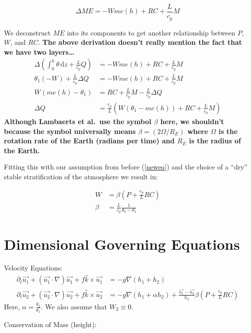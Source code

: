 \documentclass[10pt]{article}
\newcommand{\rmd}{\,\mathrm{d}}
\begin{document}
\begin{equation}
 \Delta ME = -W me(h) + RC + \frac{L}{c_p} M
\end{equation}

We deconstruct $ME$ into its components to get another relationship between $P$, $W$, and $RC$. 
{\bf The above derivation doesn't really mention the fact that we have two layers\ldots}
\begin{align*}
\Delta \left(\int_{0}^{h}\theta \rmd z + \frac{L}{c_p}Q \right) &= -W me(h) + RC + \frac{L}{c_p} M \\
\theta_1(-W) + \frac{L}{c_p}\Delta Q &=  -W me(h) + RC + \frac{L}{c_p} M \\
W \left(me(h) - \theta_1 \right) &= RC + \frac{L}{c_p} M  - \frac{L}{c_p}\Delta Q\\
\Delta Q &=\frac{c_p}{L} \left(W \left(\theta_1 - me(h) \right) + RC + \frac{L}{c_p} M  \right)
\end{align*}
{\bf Although Lambaerts et al.~use the symbol $\beta$ here, we shouldn't because the symbol universally means $\beta = (2\Omega/R_E)$ where $\Omega$ is the rotation rate of the Earth (radians per time) and $R_E$ is the radius of the Earth.}

Fitting this with our assumption from before (\ref{neweq}) and the choice of a ``dry'' stable stratification of the atmosphere we result in:

\begin{align}
W &= \beta\left(P+\frac{c_p}{L} RC\right)\\
\beta &= \frac{L}{c_p}\frac{1}{\theta_2-\theta_1}
\end{align}


\section{Dimensional Governing Equations}
Velocity Equations:
\begin{align}
\partial_t \vec{u_1} + (\vec{u_1}\cdot \nabla )\vec{u_1} +  f\hat{k} \times \vec{u_1} &= -g \nabla (h_1 + h_2)	\label{eqn:DVel}\\
\partial_t \vec{u_2} + (\vec{u_2}\cdot \nabla )\vec{u_2} +  f\hat{k} \times \vec{u_2} &= -g \nabla (h_1 + \alpha h_2)	 + \frac{\vec{u_1}-\vec{u_2}}{h_2}\beta \left(P + \frac{c_p}{L}RC \right)
\end{align}
Here, $\alpha = \frac{\theta_2}{\theta_1}$. 
We also assume that $W_2 \equiv 0$.

Conservation of Mass (height):
\end{document}
